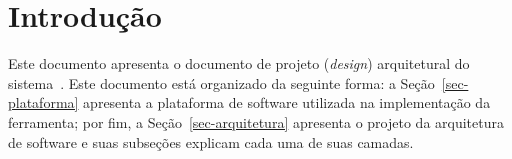 \chapter{Introdução}
\label{sec-intro}

Este documento apresenta o documento de projeto (\textit{design}) arquitetural do sistema~\imprimirtitulo. Este documento está organizado da seguinte forma: a Seção~\ref{sec-plataforma} apresenta a plataforma de software utilizada na implementação da ferramenta; por fim, a Seção~\ref{sec-arquitetura} apresenta o projeto da arquitetura de software e suas subseções explicam cada uma de suas camadas.
